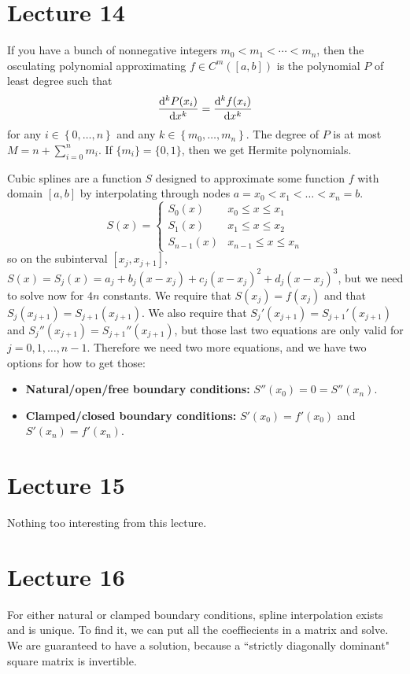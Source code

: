 \documentclass{article}
\begin{document}
\section{Lecture 14}
If you have a bunch of nonnegative integers $m_0 < m_1 < \cdots < m_n$, then the osculating polynomial approximating $f \in C^m([a,b])$ is the polynomial $P$ of least degree such that
\[ \frac{\mathrm{d}^{k} P(x_i)}{\mathrm{d} x^k} = \frac{\mathrm{d}^{k} f(x_i)}{\mathrm{d} x^k} \]
for any $i \in \left\{ 0, \dots, n \right\}$ and any $k \in \left\{ m_0, \dots, m_n \right\}$. The degree of $P$ is at most $M = n+ \sum_{i=0}^n m_i$. If $\{m_i\}=\{0,1\}$, then we get Hermite polynomials.
\par
Cubic splines are a function $S$ designed to approximate some function $f$ with domain $[a,b]$ by interpolating through nodes $a=x_0<x_1<\dots<x_n=b$.
\[ S(x) = \begin{cases}
    S_0(x) & x_0 \leq x \leq x_1 \\
    S_1(x) & x_1 \leq x \leq x_2 \\
    S_{n-1}(x) & x_{n-1} \leq x \leq x_n
\end{cases} \]
so on the subinterval $[x_j, x_{j+1}]$, $S(x) = S_j(x) = a_j + b_j(x-x_j)+c_j (x-x_j)^2 + d_j (x-x_j)^3$, but we need to solve now for $4n$ constants. We require that $S(x_j) = f(x_j)$ and that $S_j(x_{j+1})=S_{j+1}(x_{j+1})$. We also require that $S_j'(x_{j+1})=S_{j+1}'(x_{j+1})$ and $S_j''(x_{j+1})=S_{j+1}''(x_{j+1})$, but those last two equations are only valid for $j=0,1,\dots,n-1$. Therefore we need two more equations, and we have two options for how to get those:
\begin{itemize}
    \item \textbf{Natural/open/free boundary conditions:} $S''(x_0)=0=S''(x_n)$.
    \item \textbf{Clamped/closed boundary conditions:} $S'(x_0)=f'(x_0)$ and $S'(x_n)=f'(x_n)$.
\end{itemize}

\section{Lecture 15}
Nothing too interesting from this lecture.

\section{Lecture 16}
For either natural or clamped boundary conditions, spline interpolation exists and is unique. To find it, we can put all the coeffiecients in a matrix and solve. We are guaranteed to have a solution, because a ``strictly diagonally dominant" square matrix is invertible.
\end{document}
